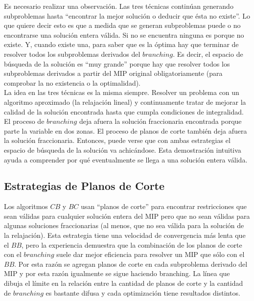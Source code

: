 Es necesario realizar una observación. Las tres técnicas continúan generando subproblemas hasta ``encontrar la mejor solución o deducir que ésta no existe''. Lo que quiere decir esto es que a medida que se generan subproblemas puede o no encontrarse una solución entera válida. Si no se encuentra ninguna es porque no existe. Y, cuando existe una, para saber que es la óptima hay que terminar de resolver todos los subproblemas derivados del $branching$. Es decir, el espacio de búsqueda de la solución es ``muy grande'' porque hay que resolver todos los subproblemas derivados a partir del MIP original obligatoriamente (para comprobar la no existencia o la optimalidad).\\

La idea en las tres técnicas es la misma siempre. Resolver un problema con un algoritmo aproximado (la relajación lineal) y continuamente tratar de mejorar la calidad de la solución encontrada hasta que cumpla condiciones de integralidad. El proceso de $branching$ deja afuera la solución fraccionaria encontrada porque parte la variable en dos zonas. El proceso de planos de corte también deja afuera la solución fraccionaria. Entonces, puede verse que con ambas estrategias el espacio de búsqueda de la solución va achicándose. Esta demostración intuitiva ayuda a comprender por qué eventualmente se llega a una solución entera válida.

\newpage

\subsection{Estrategias de Planos de Corte}

Los algoritmos $CB$ y $BC$ usan ``planos de corte'' para encontrar restricciones que sean válidas para cualquier solución entera del MIP pero que no sean válidas para algunas soluciones fraccionarias (al menos, que no sea válida para la solución de la relajación). Esta estrategia tiene una velocidad de convergencia más lenta que el $BB$, pero la experiencia demuestra que la combinación de los planos de corte con el $branching$ suele dar mejor eficiencia para resolver un MIP que sólo con el $BB$. Por esta razón se agregan planos de corte en cada subproblema derivado del MIP y por esta razón igualmente se sigue haciendo branching. La línea que dibuja el límite en la relación entre la cantidad de planos de corte y la cantidad de $branching$ es bastante difusa y cada optimización tiene resultados distintos.\\

